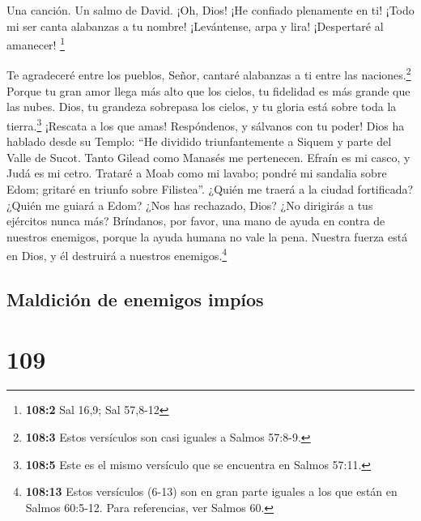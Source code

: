 Una canción. Un salmo de David.  ¡Oh, Dios! ¡He confiado
plenamente en ti! ¡Todo mi ser canta alabanzas a tu nombre!
 ¡Levántense, arpa y lira! ¡Despertaré al amanecer!
\footnote{\textbf{108:2} Sal 16,9; Sal 57,8-12}

 Te agradeceré entre los pueblos, Señor, cantaré alabanzas
a ti entre las naciones.\footnote{\textbf{108:3} Estos versículos son
  casi iguales a Salmos 57:8-9.}  Porque tu gran amor
llega más alto que los cielos, tu fidelidad es más grande que las nubes.
 Dios, tu grandeza sobrepasa los cielos, y tu gloria está
sobre toda la tierra.\footnote{\textbf{108:5} Este es el mismo versículo
  que se encuentra en Salmos 57:11.}  ¡Rescata a los que
amas! Respóndenos, y sálvanos con tu poder!  Dios ha
hablado desde su Templo: ``He dividido triunfantemente a Siquem y parte
del Valle de Sucot.  Tanto Gilead como Manasés me
pertenecen. Efraín es mi casco, y Judá es mi cetro. 
Trataré a Moab como mi lavabo; pondré mi sandalia sobre Edom; gritaré en
triunfo sobre Filistea''.  ¿Quién me traerá a la ciudad
fortificada? ¿Quién me guiará a Edom?  ¿Nos has
rechazado, Dios? ¿No dirigirás a tus ejércitos nunca más?
 Bríndanos, por favor, una mano de ayuda en contra de
nuestros enemigos, porque la ayuda humana no vale la pena.
 Nuestra fuerza está en Dios, y él destruirá a nuestros
enemigos.\footnote{\textbf{108:13} Estos versículos (6-13) son en gran
  parte iguales a los que están en Salmos 60:5-12. Para referencias, ver
  Salmos 60.}

\hypertarget{maldiciuxf3n-de-enemigos-impuxedos}{%
\subsection{Maldición de enemigos
impíos}\label{maldiciuxf3n-de-enemigos-impuxedos}}

\hypertarget{section-108}{%
\section{109}\label{section-108}}

